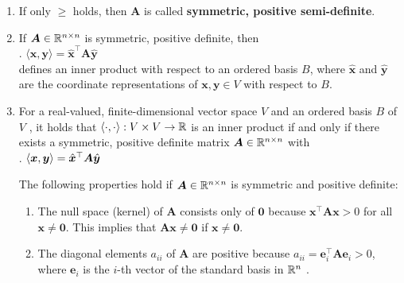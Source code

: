 \begin{enumerate}
    \item If only $\geq$ holds, then $\bm{A}$ is called \textbf{symmetric, positive semi-definite}.
    \hfill \cite{mfml/book/mml/Deisenroth-Faisal-Ong}

    \item If $\bm{A} \in \mathbb{R}^{n\times n}$ is symmetric, positive definite, then
    \hfill \cite{mfml/book/mml/Deisenroth-Faisal-Ong}
    \\
    .\hfill
    $⟨\bm{x}, \bm{y}⟩ = \hat{\bm{x}}^\top \bm{A} \hat{\bm{y}}$
    \hfill \cite{mfml/book/mml/Deisenroth-Faisal-Ong}
    \\
    defines an inner product with respect to an ordered basis $B$, where $\hat{\bm{x}}$ and $\hat{\bm{y}}$ are the coordinate representations of $\bm{x}, \bm{y} \in V$ with respect to $B$.
    \hfill \cite{mfml/book/mml/Deisenroth-Faisal-Ong}

    \item
    \begin{theorem}
        For a real-valued, finite-dimensional vector space $V$ and an ordered basis $B$ of $V$ , it holds that $\langle\cdot, \cdot\rangle : V \times V \to \mathbb{R}$ is an inner product if and only if there exists a symmetric, positive definite matrix $\bm{A} \in \mathbb{R}^{n\times n}$ with
        \hfill \cite{mfml/book/mml/Deisenroth-Faisal-Ong}
        \\
        .\hfill
        $\langle\bm{x}, \bm{y}\rangle = \hat{\bm{x}} ^\top \bm{A} \hat{\bm{y}}$
        \hfill \cite{mfml/book/mml/Deisenroth-Faisal-Ong}
    \end{theorem}

    The following properties hold if $\bm{A} \in \mathbb{R}^{n\times n}$ is symmetric and positive definite:
    \hfill \cite{mfml/book/mml/Deisenroth-Faisal-Ong}
    \begin{enumerate}
        \item The null space (kernel) of $\bm{A}$ consists only of $\bm{0}$ because $\bm{x} ^\top \bm{Ax} > 0$ for all $\bm{x} \neq \bm{0}$.
        This implies that $\bm{Ax} \neq \bm{0}$ if $\bm{x} \neq \bm{0}$.
        \hfill \cite{mfml/book/mml/Deisenroth-Faisal-Ong}

        \item The diagonal elements $a_{ii}$ of $\bm{A}$ are positive because $a_{ii} = \bm{e}^\top _i \bm{A} \bm{e}_i > 0$, where $\bm{e}_i$ is the $i$-th vector of the standard basis in $\mathbb{R}^n$ .
        \hfill \cite{mfml/book/mml/Deisenroth-Faisal-Ong}
    \end{enumerate}


\end{enumerate}
